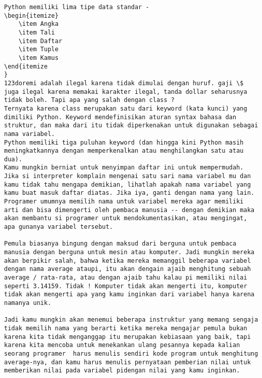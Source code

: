 \begin{verbatim}
Python memiliki lima tipe data standar -
\begin{itemize}
	\item Angka
	\item Tali
	\item Daftar
	\item Tuple
	\item Kamus
\end{itemize
}
123doremi adalah ilegal karena tidak dimulai dengan huruf. gaji \$ juga ilegal karena memakai karakter ilegal, tanda dollar seharusnya tidak boleh. Tapi apa yang salah dengan class ?
Ternyata karena class merupakan satu dari keyword (kata kunci) yang dimiliki Python. Keyword mendefinisikan aturan syntax bahasa dan struktur, dan maka dari itu tidak diperkenakan untuk digunakan sebagai nama variabel. 
Python memiliki tiga puluhan keyword (dan hingga kini Python masih meningkatkannya dengan memperkenalkan atau menghilangkan satu atau dua). 
Kamu mungkin berniat untuk menyimpan daftar ini untuk mempermudah. Jika si interpreter komplain mengenai satu sari nama variabel mu dan kamu tidak tahu mengapa demikian, lihatlah apakah nama variabel yang kamu buat masuk daftar diatas. Jika iya, ganti dengan nama yang lain.  
Programer umumnya memilih nama untuk variabel mereka agar memiliki arti dan bisa dimengerti oleh pembaca manusia -- dengan demikian maka akan membantu si programer untuk mendokumentasikan, atau mengingat, apa gunanya variabel tersebut.  

Pemula biasanya bingung dengan maksud dari berguna untuk pembaca manusia dengan berguna untuk mesin atau komputer. Jadi mungkin mereka akan berpikir salah, bahwa ketika mereka memanggil beberapa variabel dengan nama average ataupi, itu akan dengain ajaib menghitung sebuah average / rata-rata, atau dengan ajaib tahu kalau pi memiliki nilai seperti 3.14159. Tidak ! Komputer tidak akan mengerti itu, komputer tidak akan mengerti apa yang kamu inginkan dari variabel hanya karena namanya unik. 

Jadi kamu mungkin akan menemui beberapa instruktur yang memang sengaja tidak memilih nama yang berarti ketika mereka mengajar pemula bukan karena kita tidak menganggap itu merupakan kebiasaan yang baik, tapi karena kita mencoba untuk menekankan ulang pesannya kepada kalian seorang programer  harus menulis sendiri kode program untuk menghitung average-nya, dan kamu harus menulis pernyataan pemberian nilai untuk memberikan nilai pada variabel pidengan nilai yang kamu inginkan. 


\end{verbatim}
